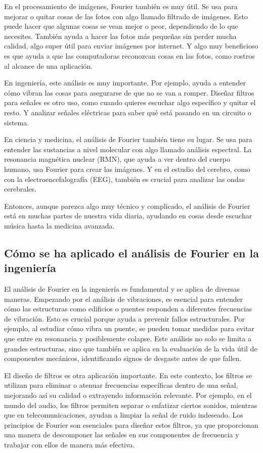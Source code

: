En el procesamiento de imágenes, Fourier también es muy útil. Se usa para mejorar o quitar cosas de las fotos con algo llamado filtrado de imágenes. Esto puede hacer que algunas cosas se vean mejor o peor, dependiendo de lo que necesites. También ayuda a hacer las fotos más pequeñas sin perder mucha calidad, algo super útil para enviar imágenes por internet. Y algo muy beneficioso es que ayuda a que las computadoras reconozcan cosas en las fotos, como rostros al alcance de una aplicación.

En ingeniería, este análisis es muy importante. Por ejemplo, ayuda a entender cómo vibran las cosas para asegurarse de que no se van a romper. Diseñar filtros para señales es otro uso, como cuando quieres escuchar algo específico y quitar el resto. Y analizar señales eléctricas para saber qué está pasando en un circuito o sistema.

En ciencia y medicina, el análisis de Fourier también tiene su lugar. Se usa para entender las sustancias a nivel molecular con algo llamado análisis espectral. La resonancia magnética nuclear (RMN), que ayuda a ver dentro del cuerpo humano, usa Fourier para crear las imágenes. Y en el estudio del cerebro, como con la electroencefalografía (EEG), también es crucial para analizar las ondas cerebrales.

Entonces, aunque parezca algo muy técnico y complicado, el análisis de Fourier está en muchas partes de nuestra vida diaria, ayudando en cosas desde escuchar música hasta la medicina avanzada.

\subsection{Cómo se ha aplicado el análisis de Fourier en la ingeniería}

El análisis de Fourier en la ingeniería es fundamental y se aplica de diversas maneras. Empezando por el análisis de vibraciones, es esencial para entender cómo las estructuras como edificios o puentes responden a diferentes frecuencias de vibración. Esto es crucial porque ayuda a prevenir fallos estructurales. Por ejemplo, al estudiar cómo vibra un puente, se pueden tomar medidas para evitar que entre en resonancia y posiblemente colapse. Este análisis no solo se limita a grandes estructuras, sino que también se aplica en la evaluación de la vida útil de componentes mecánicos, identificando signos de desgaste antes de que fallen.

El diseño de filtros es otra aplicación importante. En este contexto, los filtros se utilizan para eliminar o atenuar frecuencias específicas dentro de una señal, mejorando así su calidad o extrayendo información relevante. Por ejemplo, en el mundo del audio, los filtros permiten separar o enfatizar ciertos sonidos, mientras que en telecomunicaciones, ayudan a limpiar la señal de ruido indeseado. Los principios de Fourier son esenciales para diseñar estos filtros, ya que proporcionan una manera de descomponer las señales en sus componentes de frecuencia y trabajar con ellos de manera más efectiva.

